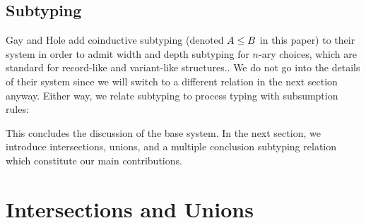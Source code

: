 \documentclass[submission,copyright,creativecommons]{eptcs}
\begin{document}
\subsection{Subtyping}
\label{original-subtyping}

Gay and Hole \cite{GayH05} add coinductive subtyping (denoted $A \le B$ in this paper) to their system in order to admit width and depth subtyping for $n$-ary choices, which are standard for record-like and variant-like structures.. We do not go into the details of their system since we will switch to a different relation in the next section anyway. Either way, we relate subtyping to process typing with subsumption rules:

This concludes the discussion of the base system. In the next section, we introduce intersections, unions, and a multiple conclusion subtyping relation which constitute our main contributions.

\section{Intersections and Unions}
\label{refinements}
\end{document}
